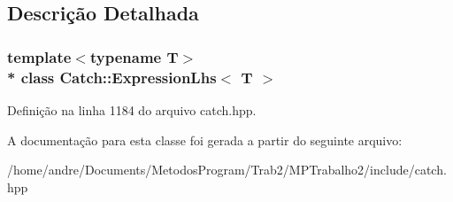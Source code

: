 \subsection{Descrição Detalhada}
\subsubsection*{template$<$typename T$>$\\*
class Catch\+::\+Expression\+Lhs$<$ T $>$}



Definição na linha 1184 do arquivo catch.\+hpp.



A documentação para esta classe foi gerada a partir do seguinte arquivo\+:\begin{DoxyCompactItemize}
\item 
/home/andre/\+Documents/\+Metodos\+Program/\+Trab2/\+M\+P\+Trabalho2/include/catch.\+hpp\end{DoxyCompactItemize}
